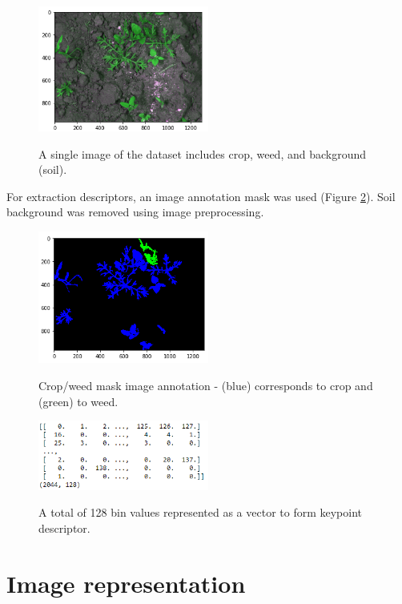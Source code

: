\documentclass[12pt]{article}
\numberwithin{equation}{section}
\numberwithin{table}{section}
\numberwithin{figure}{section}
\begin{document}
\begin{figure}[H] \centering
	\caption{A single image of the dataset includes crop, weed, and background (soil). }
	\includegraphics[width=0.5\textwidth]{plant.png}
	\label{plant}
\end{figure}

\noindent
For extraction descriptors, an image annotation mask was used (Figure \ref{mask}). Soil background was removed using image preprocessing.

\begin{figure}[H] \centering
	\caption{Crop/weed mask image annotation - (blue) corresponds to crop and (green) to weed. }
	\includegraphics[width=0.5\textwidth]{mask.png}
	\label{mask}
\end{figure}


\begin{figure}[H] \centering
	\caption{A total of 128 bin values represented as a vector to form keypoint descriptor. }
	\includegraphics[width=0.5\textwidth]{sift1.png}
	\label{sit1}
\end{figure}







\section{Image representation}
\end{document}

